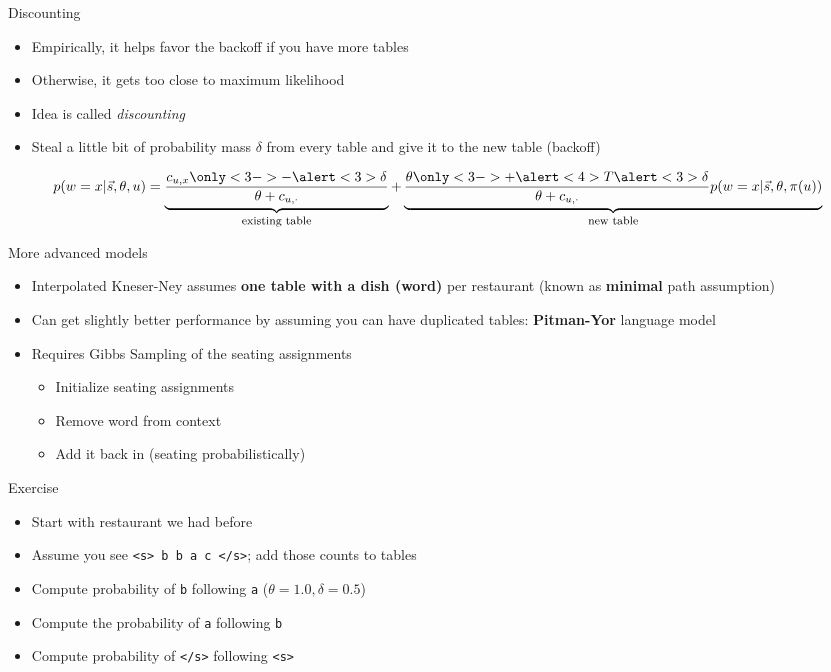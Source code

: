 \documentclass[compress]{beamer}
\begin{document}
\begin{frame}{Discounting}

\begin{itemize}
  \item Empirically, it helps favor the backoff if you have more
    tables
  \item Otherwise, it gets too close to maximum likelihood
  \item Idea is called \emph{discounting}
  \item Steal a little bit of probability mass $\delta$ from every table and
    give it to the new table (backoff)
\end{itemize}
\pause

\begin{equation}
   p(w=x | \vec{s}, \theta, u) = \explain{existing
     table}{\frac{c_{u,x} \only<3->{- \alert<3>{\delta}}}{\theta + c_{u,\cdot}}}
   + \explain{new table}{\frac{\theta \only<3->{+ \alert<4>{T}\alert<3>{\delta}}}{\theta + c_{u, \cdot}} p(w=x | \vec{s}, \theta, \pi(u))}
\end{equation}


\end{frame}

\begin{frame}{More advanced models}

\begin{itemize}
  \item Interpolated Kneser-Ney assumes {\bf one table with a dish
      (word)} per restaurant (known as {\bf minimal} path assumption)
  \item Can get slightly better performance by assuming you can have
    duplicated tables: {\bf Pitman-Yor} language model
  \item Requires Gibbs Sampling of the seating assignments
    \begin{itemize}
      \item Initialize seating assignments
      \item Remove word from context
      \item Add it back in (seating probabilistically)
    \end{itemize}
\end{itemize}

\end{frame}

\begin{frame}{Exercise}
  \begin{itemize}
    \item Start with restaurant we had before
    \item Assume you see \texttt{<s> b b a c </s>}; add those counts
      to tables
    \item Compute probability of \texttt{b} following \texttt{a}
      ($\theta=1.0, \delta=0.5$)
    \item Compute the probability of \texttt{a} following \texttt{b}
    \item Compute probability of \texttt{</s>} following \texttt{<s>}
  \end{itemize}

\end{frame}
\end{document}
